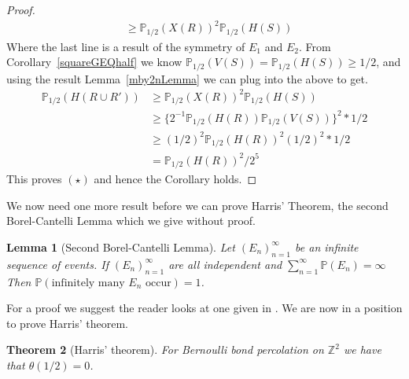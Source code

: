 \documentclass[a4paper,11pt]{article}
\newtheorem{theorem}{Theorem}[section]
\newtheorem{lemma}[theorem]{Lemma}
\theoremstyle{definition}
\newcommand{\ints}{\mathbb{Z}}
\newcommand{\prbhlf}{\mathbb{P}_{1/2}}
\begin{document}
\begin{proof}
\begin{align*}
	& \geq \prbhlf(X(R))^2\prbhlf(H(S))
	\end{align*}
	Where the last line is a result of the symmetry of $E_1$ and $E_2$. From Corollary~\ref{squareGEQhalf} we know $\prbhlf(V(S)) =\prbhlf(H(S)) \geq 1/2$, and using the result Lemma~\ref{mby2nLemma} we can plug into the above to get.
	\begin{align*}
		\prbhlf(H(R \cup R')) & \geq \prbhlf(X(R))^2\prbhlf(H(S)) \\
		& \geq \{2^{-1} \prbhlf (H(R)) \prbhlf (V(S))\}^2*1/2 \\
		& \geq (1/2)^2 \prbhlf(H(R))^2(1/2)^2*1/2 \\
		& = \prbhlf(H(R))^2/2^5
	\end{align*}
	This proves $(\star)$ and hence the Corollary holds. 
\end{proof}

We now need one more result before we can prove Harris' Theorem, the second Borel-Cantelli Lemma which we give without proof. 
\begin{lemma}[Second Borel-Cantelli Lemma]
	Let $(E_n)_{n=1}^\infty$ be an infinite sequence of events. If $(E_n)_{n=1}^\infty$ are all independent and $\sum_{n=1}^{\infty} \mathbb{P}(E_n) = \infty$ Then $\mathbb{P}(\text{infinitely many }E_n\text{ occur}) = 1$.
\end{lemma}
For a proof we suggest the reader looks at one given in \cite{billingsley2008probability}.
We are now in a position to prove Harris' theorem.

\begin{theorem}[Harris' theorem]
	For Bernoulli bond percolation on $\ints^2$ we have that $\theta(1/2) = 0$.
\end{theorem}
\end{document}
